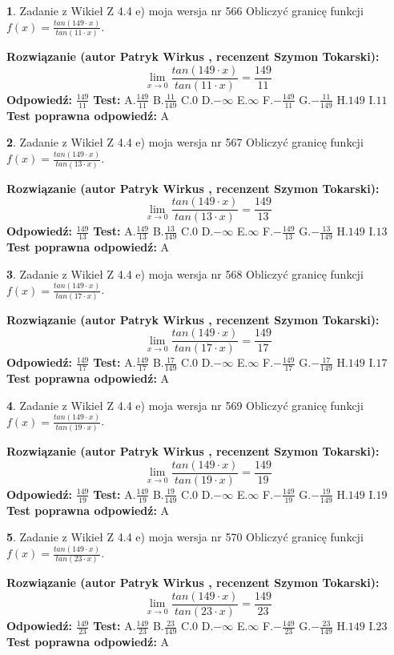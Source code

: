 \documentclass[12pt, a4paper]{article}
\theoremstyle{definition} %
\newtheorem{zad}{}
\newcommand{\zadStart}[1]{\begin{zad}#1\newline}
\newcommand{\zadStop}{\end{zad}}
\newcommand{\rozwStart}[2]{\noindent \textbf{Rozwiązanie (autor #1 , recenzent #2): }\newline}
\newcommand{\rozwStop}{\newline}
\newcommand{\odpStart}{\noindent \textbf{Odpowiedź:}\newline}
\newcommand{\odpStop}{\newline}
\newcommand{\testStart}{\noindent \textbf{Test:}\newline}
\newcommand{\testStop}{\newline}
\newcommand{\kluczStart}{\noindent \textbf{Test poprawna odpowiedź:}\newline}
\newcommand{\kluczStop}{\newline}
\begin{document}
\zadStart{Zadanie z Wikieł Z 4.4 e) moja wersja nr 566}
Obliczyć granicę funkcji $f(x)=\frac{tan(149\cdot x)}{tan(11\cdot x)}$.
\zadStop
\rozwStart{Patryk Wirkus}{Szymon Tokarski}
$$\lim\limits_{x\to 0}\frac{tan(149\cdot x)}{tan(11\cdot x)}=
\frac{149}{11}$$
\rozwStop
\odpStart
$\frac{149}{11}$
\odpStop
\testStart
A.$\frac{149}{11}$
B.$\frac{11}{149}$
C.$0$
D.$-\infty$
E.$\infty$
F.$-\frac{149}{11}$
G.$-\frac{11}{149}$
H.$149$
I.$11$
\testStop
\kluczStart
A
\kluczStop



\zadStart{Zadanie z Wikieł Z 4.4 e) moja wersja nr 567}
Obliczyć granicę funkcji $f(x)=\frac{tan(149\cdot x)}{tan(13\cdot x)}$.
\zadStop
\rozwStart{Patryk Wirkus}{Szymon Tokarski}
$$\lim\limits_{x\to 0}\frac{tan(149\cdot x)}{tan(13\cdot x)}=
\frac{149}{13}$$
\rozwStop
\odpStart
$\frac{149}{13}$
\odpStop
\testStart
A.$\frac{149}{13}$
B.$\frac{13}{149}$
C.$0$
D.$-\infty$
E.$\infty$
F.$-\frac{149}{13}$
G.$-\frac{13}{149}$
H.$149$
I.$13$
\testStop
\kluczStart
A
\kluczStop



\zadStart{Zadanie z Wikieł Z 4.4 e) moja wersja nr 568}
Obliczyć granicę funkcji $f(x)=\frac{tan(149\cdot x)}{tan(17\cdot x)}$.
\zadStop
\rozwStart{Patryk Wirkus}{Szymon Tokarski}
$$\lim\limits_{x\to 0}\frac{tan(149\cdot x)}{tan(17\cdot x)}=
\frac{149}{17}$$
\rozwStop
\odpStart
$\frac{149}{17}$
\odpStop
\testStart
A.$\frac{149}{17}$
B.$\frac{17}{149}$
C.$0$
D.$-\infty$
E.$\infty$
F.$-\frac{149}{17}$
G.$-\frac{17}{149}$
H.$149$
I.$17$
\testStop
\kluczStart
A
\kluczStop



\zadStart{Zadanie z Wikieł Z 4.4 e) moja wersja nr 569}
Obliczyć granicę funkcji $f(x)=\frac{tan(149\cdot x)}{tan(19\cdot x)}$.
\zadStop
\rozwStart{Patryk Wirkus}{Szymon Tokarski}
$$\lim\limits_{x\to 0}\frac{tan(149\cdot x)}{tan(19\cdot x)}=
\frac{149}{19}$$
\rozwStop
\odpStart
$\frac{149}{19}$
\odpStop
\testStart
A.$\frac{149}{19}$
B.$\frac{19}{149}$
C.$0$
D.$-\infty$
E.$\infty$
F.$-\frac{149}{19}$
G.$-\frac{19}{149}$
H.$149$
I.$19$
\testStop
\kluczStart
A
\kluczStop



\zadStart{Zadanie z Wikieł Z 4.4 e) moja wersja nr 570}
Obliczyć granicę funkcji $f(x)=\frac{tan(149\cdot x)}{tan(23\cdot x)}$.
\zadStop
\rozwStart{Patryk Wirkus}{Szymon Tokarski}
$$\lim\limits_{x\to 0}\frac{tan(149\cdot x)}{tan(23\cdot x)}=
\frac{149}{23}$$
\rozwStop
\odpStart
$\frac{149}{23}$
\odpStop
\testStart
A.$\frac{149}{23}$
B.$\frac{23}{149}$
C.$0$
D.$-\infty$
E.$\infty$
F.$-\frac{149}{23}$
G.$-\frac{23}{149}$
H.$149$
I.$23$
\testStop
\kluczStart
A
\kluczStop
\end{document}

